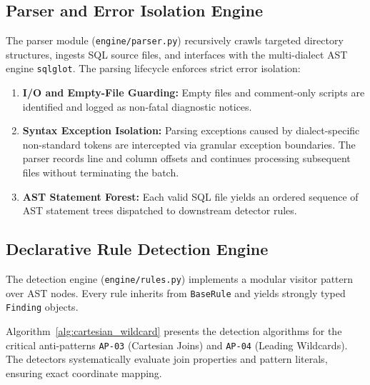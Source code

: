 \documentclass[conference]{IEEEtran}
\begin{document}
\subsection{Parser and Error Isolation Engine}
The parser module (\texttt{engine/parser.py}) recursively crawls targeted directory structures, ingests SQL source files, and interfaces with the multi-dialect AST engine \texttt{sqlglot}. The parsing lifecycle enforces strict error isolation:
\begin{enumerate}
    \item \textbf{I/O and Empty-File Guarding:} Empty files and comment-only scripts are identified and logged as non-fatal diagnostic notices.
    \item \textbf{Syntax Exception Isolation:} Parsing exceptions caused by dialect-specific non-standard tokens are intercepted via granular exception boundaries. The parser records line and column offsets and continues processing subsequent files without terminating the batch.
    \item \textbf{AST Statement Forest:} Each valid SQL file yields an ordered sequence of AST statement trees dispatched to downstream detector rules.
\end{enumerate}

\subsection{Declarative Rule Detection Engine}
The detection engine (\texttt{engine/rules.py}) implements a modular visitor pattern over AST nodes. Every rule inherits from \texttt{BaseRule} and yields strongly typed \texttt{Finding} objects. 

Algorithm~\ref{alg:cartesian_wildcard} presents the detection algorithms for the critical anti-patterns \texttt{AP-03} (Cartesian Joins) and \texttt{AP-04} (Leading Wildcards). The detectors systematically evaluate join properties and pattern literals, ensuring exact coordinate mapping.
\end{document}
